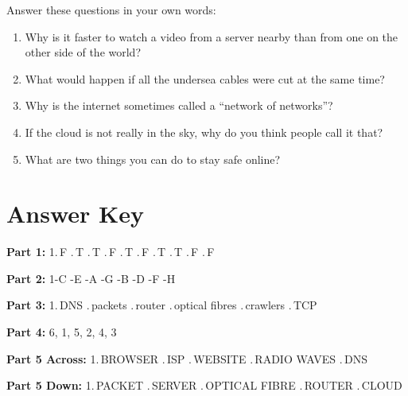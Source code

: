 \begin{tcolorbox}[enhanced,colback=SunYellow!10,colframe=SunYellow!70!black,arc=6pt,boxrule=1pt,
  left=10pt,right=10pt,top=8pt,bottom=8pt]

Answer these questions in your own words:

\begin{enumerate}[label=\textbf{\arabic*.}]
  \item Why is it faster to watch a video from a server nearby than from one on the other side of the world?
  \item What would happen if all the undersea cables were cut at the same time?
  \item Why is the internet sometimes called a ``network of networks''?
  \item If the cloud is not really in the sky, why do you think people call it that?
  \item What are two things you can do to stay safe online?
\end{enumerate}
\end{tcolorbox}

\vspace{16pt}

\section*{Answer Key}

\begin{tcolorbox}[enhanced,colback=LightGray,colframe=InternetBlue!50,arc=6pt,boxrule=1pt,
  left=10pt,right=10pt,top=8pt,bottom=8pt,
  title={Answers (no peeking until you try!)},fonttitle=\bfseries\color{DarkText}]

\textbf{Part 1:} 1.\,F .\,T .\,T .\,F .\,T .\,F .\,T .\,T .\,F .\,F

\vspace{6pt}
\textbf{Part 2:} 1-C -E -A -G -B -D -F -H

\vspace{6pt}
\textbf{Part 3:} 1.\,DNS .\,packets .\,router .\,optical fibres .\,crawlers .\,TCP

\vspace{6pt}
\textbf{Part 4:} 6, 1, 5, 2, 4, 3

\vspace{6pt}
\textbf{Part 5 Across:} 1.\,BROWSER .\,ISP .\,WEBSITE .\,RADIO WAVES .\,DNS

\textbf{Part 5 Down:} 1.\,PACKET .\,SERVER .\,OPTICAL FIBRE .\,ROUTER .\,CLOUD
\end{tcolorbox}
